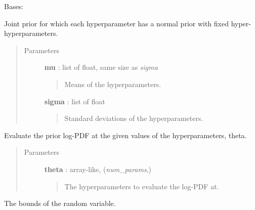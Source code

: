 \documentclass[letterpaper,10pt,english]{sphinxmanual}
\begin{document}
\begin{fulllineitems}
\label{gptools:gptools.utils.NormalJointPrior}
Bases: {\hyperref[gptools:gptools.utils.JointPrior]{}}

Joint prior for which each hyperparameter has a normal prior with fixed hyper-hyperparameters.
\begin{quote}\begin{description}
\item[{Parameters}] \leavevmode
\textbf{mu} : list of float, same size as \emph{sigma}
\begin{quote}

Means of the hyperparameters.
\end{quote}

\textbf{sigma} : list of float
\begin{quote}

Standard deviations of the hyperparameters.
\end{quote}

\end{description}\end{quote}

\begin{fulllineitems}
\label{gptools:gptools.utils.NormalJointPrior.__call__}
Evaluate the prior log-PDF at the given values of the hyperparameters, theta.
\begin{quote}\begin{description}
\item[{Parameters}] \leavevmode
\textbf{theta} : array-like, (\emph{num\_params},)
\begin{quote}

The hyperparameters to evaluate the log-PDF at.
\end{quote}

\end{description}\end{quote}

\end{fulllineitems}


\begin{fulllineitems}
\label{gptools:gptools.utils.NormalJointPrior.bounds}
The bounds of the random variable.


\end{fulllineitems}
\end{fulllineitems}
\end{document}
